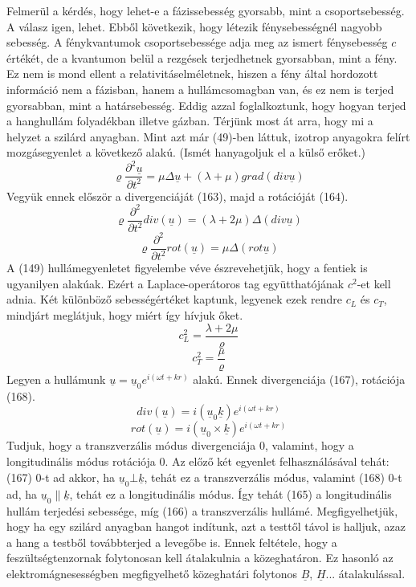 \documentclass[a4paper,12pt]{article}
\begin{document}
Felmerül a kérdés, hogy lehet-e a fázissebesség gyorsabb, mint a csoportsebesség. A válasz igen, lehet. Ebből következik, hogy létezik fénysebességnél nagyobb sebesség. A fénykvantumok csoportsebessége adja meg az ismert fénysebesség $c$ értékét, de a kvantumon belül a rezgések terjedhetnek gyorsabban, mint a fény. Ez nem is mond ellent a relativitáselméletnek, hiszen a fény által hordozott információ nem a fázisban, hanem a hullámcsomagban van, és ez nem is terjed gyorsabban, mint a határsebesség.
Eddig azzal foglalkoztunk, hogy hogyan terjed a hanghullám folyadékban illetve gázban. Térjünk most át arra, hogy mi a helyzet a szilárd anyagban. Mint azt már (49)-ben láttuk, izotrop anyagokra felírt mozgásegyenlet a következő alakú. (Ismét hanyagoljuk el a külső erőket.)
\begin{equation}
\varrho\frac{\partial^2\underline{u}}{\partial t^2}=\mu\Delta\underline{u}+(\lambda+\mu)grad(div\underline{u})
\end{equation}
Vegyük ennek először a divergenciáját (163), majd a rotációját (164).
\begin{equation}
\varrho\frac{\partial^2}{\partial t^2}div(\underline{u})=(\lambda+2\mu)\Delta(div\underline{u})
\end{equation}
\begin{equation}
\varrho\frac{\partial^2}{\partial t^2}rot(\underline{u})=\mu\Delta(rot\underline{u})
\end{equation}
A (149) hullámegyenletet figyelembe véve észrevehetjük, hogy a fentiek is ugyanilyen alakúak. Ezért a Laplace-operátoros tag együtthatójának $c^2$-et kell adnia. Két különböző sebességértéket kaptunk, legyenek ezek rendre $c_L$ és $c_T$, mindjárt meglátjuk, hogy miért így hívjuk őket.
\begin{equation}
c_L^2=\frac{\lambda+2\mu}{\varrho}
\end{equation}
\begin{equation}
c_T^2=\frac{\mu}{\varrho}
\end{equation}
Legyen a hullámunk $\underline{u}=\underline{u}_0e^{i(\omega t+kr)}$ alakú. Ennek divergenciája (167), rotációja (168).
\begin{equation}
div(\underline{u})=i(\underline{u}_0\underline{k})e^{i(\omega t+kr)}
\end{equation}
\begin{equation}
rot(\underline{u})=i(\underline{u}_0\times\underline{k})e^{i(\omega t+kr)}
\end{equation}
Tudjuk, hogy a transzverzális módus divergenciája 0, valamint, hogy a longitudinális módus rotációja 0. Az előző két egyenlet felhasználásával tehát: (167) 0-t ad akkor, ha $\underline{u}_0\bot\underline{k}$, tehát ez a transzverzális módus, valamint (168) 0-t ad, ha $\underline{u}_0\parallel\underline{k}$, tehát ez a longitudinális módus. Így tehát (165) a longitudinális hullám terjedési sebessége, míg (166) a transzverzális hullámé.
Megfigyelhetjük, hogy ha egy szilárd anyagban hangot indítunk, azt a testtől távol is halljuk, azaz a hang a testből továbbterjed a levegőbe is. Ennek feltétele, hogy a feszültségtenzornak folytonosan kell átalakulnia a közeghatáron. Ez hasonló az elektromágnesességben megfigyelhető közeghatári folytonos $\underline{B}$, $\underline{H}$... átalakulással.
\pagebreak
\end{document}
